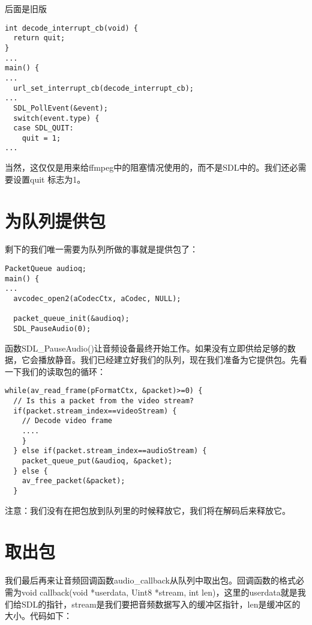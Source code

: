 后面是旧版
\begin{lstlisting}
int decode_interrupt_cb(void) {
  return quit;
}
...
main() {
...
  url_set_interrupt_cb(decode_interrupt_cb);
...
  SDL_PollEvent(&event);
  switch(event.type) {
  case SDL_QUIT:
    quit = 1;
...
\end{lstlisting}

当然，这仅仅是用来给ffmpeg中的阻塞情况使用的，而不是SDL中的。我们还必需要设置quit 标志为1。

\section{为队列提供包}


剩下的我们唯一需要为队列所做的事就是提供包了：

\begin{lstlisting}
PacketQueue audioq;
main() {
...
  avcodec_open2(aCodecCtx, aCodec, NULL);

  packet_queue_init(&audioq);
  SDL_PauseAudio(0);
\end{lstlisting}

函数SDL_PauseAudio()让音频设备最终开始工作。如果没有立即供给足够的数据，它会播放静音。我们已经建立好我们的队列，现在我们准备为它提供包。先看一下我们的读取包的循环：

\begin{lstlisting}
while(av_read_frame(pFormatCtx, &packet)>=0) {
  // Is this a packet from the video stream?
  if(packet.stream_index==videoStream) {
    // Decode video frame
    ....
    }
  } else if(packet.stream_index==audioStream) {
    packet_queue_put(&audioq, &packet);
  } else {
    av_free_packet(&packet);
  }
\end{lstlisting}

注意：我们没有在把包放到队列里的时候释放它，我们将在解码后来释放它。

\section{取出包}

我们最后再来让音频回调函数audio_callback从队列中取出包。回调函数的格式必需为void callback(void *userdata, Uint8 *stream, int len)，这里的userdata就是我们给SDL的指针，stream是我们要把音频数据写入的缓冲区指针，len是缓冲区的大小。代码如下：

